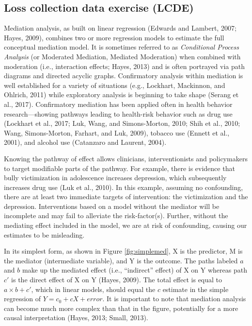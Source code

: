 \documentclass[]{DissertateUSU}
\begin{document}
\subsection{Loss collection data exercise (LCDE)}

Mediation analysis, as built on linear regression (Edwards and Lambert,
2007; Hayes, 2009), combines two or more regression models to estimate
the full conceptual mediation model. It is sometimes referred to as
\emph{Conditional Process Analysis} (or Moderated Mediation, Mediated
Moderation) when combined with moderation (i.e., interaction effects;
Hayes, 2013) and is often portrayed via path diagrams and directed
acyclic graphs. Confirmatory analysis within mediation is well
established for a variety of situations (e.g., Lockhart, Mackinnon, and
Ohlrich, 2011) while exploratory analysis is beginning to take shape
(Serang et al., 2017). Confirmatory mediation has been applied often in
health behavior research---showing pathways leading to health-risk
behavior such as drug use (Lockhart et al., 2017; Luk, Wang, and
Simons-Morton, 2010; Shih et al., 2010; Wang, Simons-Morton, Farhart,
and Luk, 2009), tobacco use (Ennett et al., 2001), and alcohol use
(Catanzaro and Laurent, 2004).

Knowing the pathway of effect allows clinicians, interventionists and
policymakers to target modifiable parts of the pathway. For example,
there is evidence that bully victimization in adolescence increases
depression, which subsequently increases drug use (Luk et al., 2010). In
this example, assuming no confounding, there are at least two immediate
targets of intervention: the victimization and the depression.
Interventions based on a model without the mediator will be incomplete
and may fail to alleviate the risk-factor(s). Further, without the
mediating effect included in the model, we are at risk of confounding,
causing our estimates to be misleading.

In its simplest form, as shown in Figure \ref{fig:simplemed}, X is the
predictor, M is the mediator (intermediate variable), and Y is the
outcome. The paths labeled \(a\) and \(b\) make up the mediated effect
(i.e., ``indirect'' effect) of X on Y whereas path \(c'\) is the direct
effect of X on Y (Hayes, 2009). The total effect is equal to
\(a \times b + c'\), which in linear models, should equal the \(c\)
estimate in the simple regression of \(Y = c_0 + cX + error\). It is
important to note that mediation analysis can become much more complex
than that in the figure, potentially for a more causal interpretation
(Hayes, 2013; Small, 2013).
\end{document}
